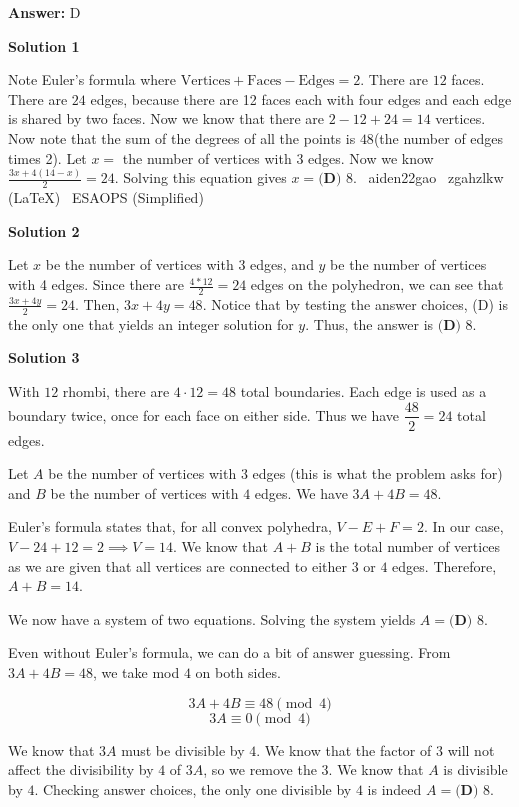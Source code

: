 \begin{enumerate}
 \textbf{Answer: }D



\textbf{Solution 1}

Note Euler's formula where $\text{Vertices}+\text{Faces}-\text{Edges}=2$. There are $12$ faces. There are $24$ edges, because there are 12 faces each with four edges and each edge is shared by two faces. Now we know that there are $2-12+24=14$ vertices. Now note that the sum of the degrees of all the points is $48$(the number of edges times 2). Let $x=$ the number of vertices with $3$ edges. Now we know $\frac{3x+4(14-x)}{2}=24$. Solving this equation gives $x = \boxed{\textbf{(D) }8}$. ~aiden22gao ~zgahzlkw (LaTeX) ~ESAOPS (Simplified)

 



\textbf{Solution 2}

Let $x$ be the number of vertices with 3 edges, and $y$ be the number of vertices with 4 edges. Since there are $\frac{4*12}{2}=24$ edges on the polyhedron, we can see that $\frac{3x+4y}{2}=24$. Then, $3x+4y=48$. Notice that by testing the answer choices, (D) is the only one that yields an integer solution for $y$. Thus, the answer is $\boxed{\textbf{(D) }8}$.

 



\textbf{Solution 3}

With $12$ rhombi, there are $4\cdot12=48$ total boundaries. Each edge is used as a boundary twice, once for each face on either side. Thus we have $\dfrac{48}2=24$ total edges.

 Let $A$ be the number of vertices with $3$ edges (this is what the problem asks for) and $B$ be the number of vertices with $4$ edges. We have $3A + 4B = 48$.

 Euler's formula states that, for all convex polyhedra, $V-E+F=2$. In our case, $V-24+12=2\implies V=14.$ We know that $A+B$ is the total number of vertices as we are given that all vertices are connected to either $3$ or $4$ edges. Therefore, $A+B=14.$

 We now have a system of two equations. Solving the system yields $A=\boxed{\textbf{(D) }8}$.

 Even without Euler's formula, we can do a bit of answer guessing. From $3A+4B=48$, we take mod $4$ on both sides.

 
 \[3A+4B\equiv48\pmod{4}\]
 \[3A\equiv0\pmod{4}\]

 We know that $3A$ must be divisible by $4$. We know that the factor of $3$ will not affect the divisibility by $4$ of $3A$, so we remove the $3$. We know that $A$ is divisible by $4$. Checking answer choices, the only one divisible by $4$ is indeed $A=\boxed{\textbf{(D) }8}$.


\end{enumerate}
